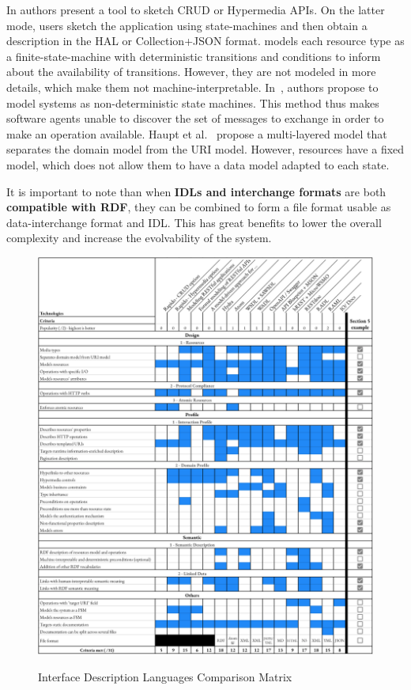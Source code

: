 In \cite{Rapido} authors present a tool to sketch CRUD or Hypermedia APIs. On the latter mode, users sketch the application using state-machines and then obtain a description in the HAL or Collection+JSON format.
\cite{Schreier:2011:MRA:1967428.1967434} models each resource type as a finite-state-machine with deterministic transitions and conditions to inform about the availability of transitions. However, they are not modeled in more details, which make them not machine-interpretable.
In~\cite{10.1007/978-3-642-22233-7_24}, authors propose to model systems as non-deterministic state machines. This method thus makes software agents unable to discover the set of messages to exchange in order to make an operation available.
Haupt et al.~\cite{10.1109/ICWS.2014.30} propose a multi-layered model that separates the domain model from the URI model. However, resources have a fixed model, which does not allow them to have a data model adapted to each state.

It is important to note than when \textbf{IDLs and interchange formats} are both \textbf{compatible with RDF}, they can be combined to form a file format usable as data-interchange format and IDL. This has great benefits to lower the overall complexity and increase the evolvability of the system.

\begin{figure}[!ht]
\caption{Interface Description Languages Comparison Matrix}
\includegraphics[width=1\textwidth]{figures/IDL.png}
\label{idl-matrix}
\vspace{-1.2cm}
\end{figure}

